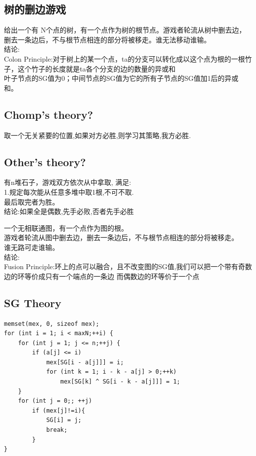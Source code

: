 \documentclass[10pt]{ctexart}
\begin{document}
{\subsection{树的删边游戏}
给出一个有 N个点的树，有一个点作为树的根节点。游戏者轮流从树中删去边，删去一条边后，不与根节点相连的部分将被移走。谁无法移动谁输。\\
结论:\\
Colon Principle:对于树上的某一个点，ta的分支可以转化成以这个点为根的一根竹子，这个竹子的长度就是ta各个分支的边的数量的异或和\\
叶子节点的SG值为0；中间节点的SG值为它的所有子节点的SG值加1后的异或和。\\

\subsection{Chomp's theory?}
取一个无关紧要的位置,如果对方必胜,则学习其策略,我方必胜.
\subsection{Other's theory?}
有n堆石子，游戏双方依次从中拿取, 满足:\\
1.规定每次能从任意多堆中取1根,不可不取.\\
最后取完者为胜。\\
结论:如果全是偶数,先手必败,否者先手必胜\\
\par
一个无相联通图，有一个点作为图的根。\\
游戏者轮流从图中删去边，删去一条边后，不与根节点相连的部分将被移走。\\
谁无路可走谁输。\\
结论:\\
Fusion Principle:环上的点可以融合，且不改变图的SG值,我们可以把一个带有奇数边的环等价成只有一个端点的一条边 而偶数边的环等价于一个点\\
\subsection{SG Theory}
\begin{lstlisting}
memset(mex, 0, sizeof mex);
for (int i = 1; i < maxN;++i) {
    for (int j = 1; j <= n;++j) {
        if (a[j] <= i)
            mex[SG[i - a[j]]] = i;
            for (int k = 1; i - k - a[j] > 0;++k)
                mex[SG[k] ^ SG[i - k - a[j]]] = 1;
    }
    for (int j = 0;; ++j)
        if (mex[j]!=i){
            SG[i] = j;
            break;
        }
}
\end{lstlisting}
}
\end{document}
